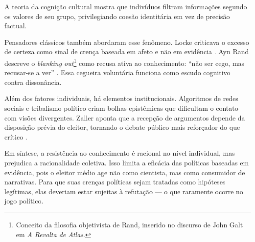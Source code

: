 A teoria da cognição cultural \cite{kahan2012polarization} mostra que indivíduos filtram informações segundo os valores de seu grupo, privilegiando coesão identitária em vez de precisão factual.

Pensadores clássicos também abordaram esse fenômeno. Locke criticava o excesso de certeza como sinal de crença baseada em afeto e não em evidência \cite{locke2014ensaio}. Ayn Rand descreve o \textit{blanking out}\footnote{Conceito da filosofia objetivista de Rand, inserido no discurso de John Galt em \textit{A Revolta de Atlas}.} como recusa ativa ao conhecimento: ``não ser cego, mas recusar-se a ver'' \cite[p.~869]{rand2012revolta}. Essa cegueira voluntária funciona como escudo cognitivo contra dissonância.

Além dos fatores individuais, há elementos institucionais. Algoritmos de redes sociais e tribalismo político criam bolhas epistêmicas que dificultam o contato com visões divergentes. Zaller aponta que a recepção de argumentos depende da disposição prévia do eleitor, tornando o debate público mais reforçador do que crítico \cite{zaller1992nature}.

Em síntese, a resistência ao conhecimento é racional no nível individual, mas prejudica a racionalidade coletiva. Isso limita a eficácia das políticas baseadas em evidência, pois o eleitor médio age não como cientista, mas como consumidor de narrativas. Para que suas crenças políticas sejam tratadas como hipóteses legítimas, elas deveriam estar sujeitas à refutação — o que raramente ocorre no jogo político.
